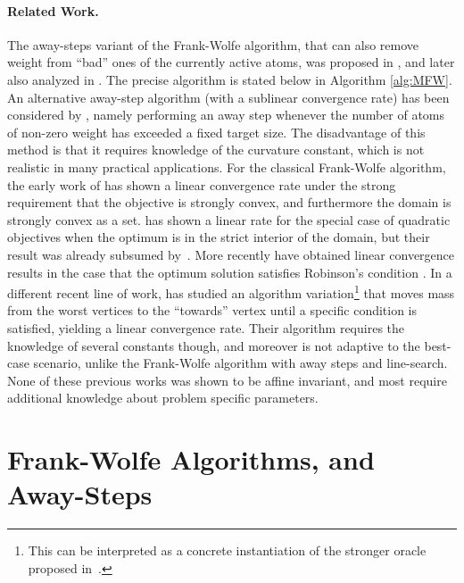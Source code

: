 \documentclass{article} %
\newcommand{\0}{\mathbf{0}} %
\begin{document}
\paragraph{Related Work.}
%
The away-steps variant of the Frank-Wolfe algorithm, that can also remove weight from ``bad'' ones of the currently active atoms, was proposed in \cite{Wolfe:1970wy}, and later also analyzed in \cite{Guelat:1986fq}. The precise algorithm is stated below in Algorithm \ref{alg:MFW}.
An alternative away-step algorithm (with a sublinear convergence rate) has been considered by \cite{Clarkson:2010hv}, namely performing an away step whenever the number of atoms of non-zero weight has exceeded a fixed target size. The disadvantage of this method is that it requires knowledge of the curvature constant, which is not realistic in many practical applications. %
%
For the classical Frank-Wolfe algorithm, the early work of \cite[Theorem 6.1]{Levitin:1966gf} has shown a linear convergence rate under the strong requirement that the objective is strongly convex, and furthermore the domain is strongly convex as a set. %
\cite{Beck:2004jm} has shown a linear rate for the special case of quadratic objectives when the optimum is in the strict interior of the domain, 
%
but their result was already subsumed by~\cite{Guelat:1986fq}.
More recently \cite{Ahipasaoglu:2008il,Kumar:2010ku,Allende:2013vw} have obtained linear convergence results in the case that the optimum solution satisfies Robinson's condition \cite{Robinson:1982ii}.
In a different recent line of work, \cite{Garber:2013vl,Garber:2013dl} has studied an algorithm variation\footnote{This can be interpreted as a concrete instantiation of the stronger oracle proposed in~\cite{Lan:2013um}.} that moves mass from the worst vertices to the ``towards'' vertex until a specific condition is satisfied, yielding a linear convergence rate. %
Their algorithm requires the knowledge of several constants though, and moreover is not adaptive to the best-case scenario, unlike the Frank-Wolfe algorithm with away steps and line-search. 
None of these previous works was shown to be affine invariant, and most require additional knowledge about problem specific parameters.%
%


\vspace{-2mm}
%
\section{Frank-Wolfe Algorithms, and Away-Steps}\vspace{-2mm}
\end{document}
